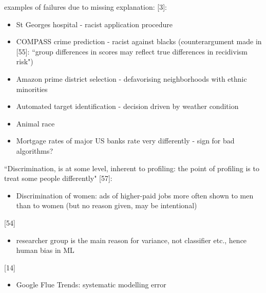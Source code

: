 examples of failures due to missing explanation:
[3]:
\begin{itemize}
	\item St Georges hospital - racist application procedure 
	\item COMPASS crime prediction - racist against blacks (counterargument made in [55]: ``group differences in scores may reflect true differences in recidivism risk")
	\item Amazon prime district selection - defavorising neighborhoods with ethnic minorities
	\item Automated target identification - decision driven by weather condition
	\item Animal race 
	\item Mortgage rates of major US banks rate very differently - sign for bad algorithms?
\end{itemize}
``Discrimination, is at some level, inherent to profiling: the point of profiling is to treat some people differently" [57]:
\begin{itemize}
	\item Discrimination of women: ads of higher-paid jobs more often shown to men than to women (but no reason given, may be intentional)
\end{itemize}
[54]
\begin{itemize}
	\item researcher group is the main reason for variance, not classifier etc., hence human bias in ML
\end{itemize}
[14]
\begin{itemize}
	\item Google Flue Trends: systematic modelling error 
\end{itemize}


